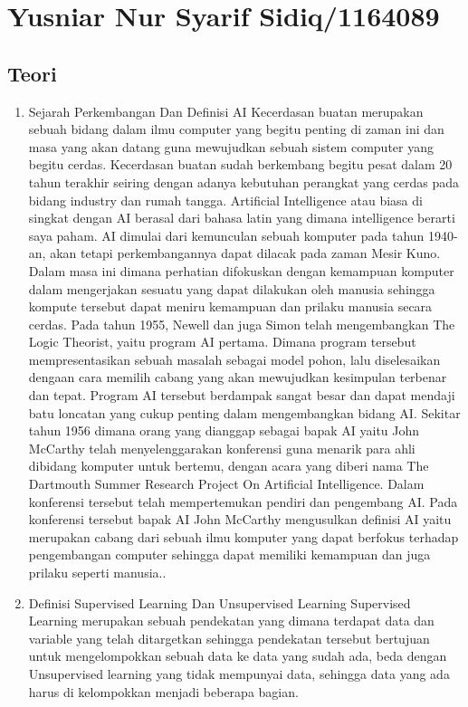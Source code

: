\section{Yusniar Nur Syarif Sidiq/1164089}
\subsection{Teori}
\begin{enumerate}

\item
Sejarah Perkembangan Dan Definisi AI
\subitem
Kecerdasan buatan merupakan sebuah bidang dalam ilmu computer yang begitu penting di zaman ini dan masa yang akan datang guna mewujudkan sebuah sistem computer yang begitu cerdas. Kecerdasan buatan sudah berkembang begitu pesat dalam 20 tahun terakhir seiring dengan adanya kebutuhan perangkat yang cerdas pada bidang industry dan rumah tangga.
\subitem
Artificial Intelligence atau biasa di singkat dengan AI berasal dari bahasa latin yang dimana intelligence berarti saya paham. AI dimulai dari kemunculan sebuah komputer pada tahun 1940-an, akan tetapi perkembangannya dapat dilacak pada zaman Mesir Kuno. Dalam masa ini dimana perhatian difokuskan dengan kemampuan komputer dalam mengerjakan sesuatu yang dapat dilakukan oleh manusia sehingga kompute tersebut dapat meniru kemampuan dan prilaku manusia secara cerdas.
\subitem
Pada tahun 1955, Newell dan juga Simon telah mengembangkan The Logic Theorist, yaitu program AI pertama. Dimana program tersebut mempresentasikan sebuah masalah sebagai model pohon, lalu diselesaikan dengaan cara memilih cabang yang akan mewujudkan kesimpulan terbenar dan tepat. Program AI tersebut berdampak sangat besar dan dapat mendaji batu loncatan yang cukup penting dalam mengembangkan bidang AI. Sekitar tahun 1956 dimana orang yang dianggap sebagai bapak AI yaitu John McCarthy telah menyelenggarakan konferensi guna menarik para ahli dibidang komputer untuk bertemu, dengan acara yang diberi nama The Dartmouth Summer Research Project On Artificial Intelligence. Dalam konferensi tersebut telah mempertemukan pendiri dan pengembang AI. Pada konferensi tersebut bapak AI John McCarthy mengusulkan definisi AI yaitu merupakan cabang dari sebuah ilmu komputer yang dapat berfokus terhadap pengembangan computer sehingga dapat memiliki kemampuan dan juga prilaku seperti manusia.\cite{baraja2008kecerdasan}.

\item
Definisi Supervised Learning Dan Unsupervised Learning
\subitem
Supervised Learning merupakan sebuah pendekatan yang dimana terdapat data dan variable yang telah ditargetkan sehingga pendekatan tersebut bertujuan untuk mengelompokkan sebuah data ke data yang sudah ada, beda dengan Unsupervised learning yang tidak mempunyai data, sehingga data yang ada harus di kelompokkan menjadi beberapa bagian.


\end{enumerate}
